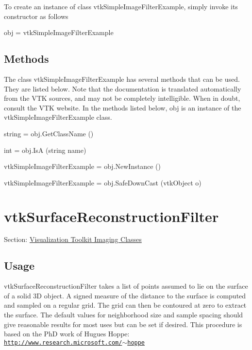 To create an instance of class vtk\-Simple\-Image\-Filter\-Example, simply invoke its constructor as follows \begin{DoxyVerb}  obj = vtkSimpleImageFilterExample
\end{DoxyVerb}
 \hypertarget{vtkwidgets_vtkxyplotwidget_Methods}{}\subsection{Methods}\label{vtkwidgets_vtkxyplotwidget_Methods}
The class vtk\-Simple\-Image\-Filter\-Example has several methods that can be used. They are listed below. Note that the documentation is translated automatically from the V\-T\-K sources, and may not be completely intelligible. When in doubt, consult the V\-T\-K website. In the methods listed below, {\ttfamily obj} is an instance of the vtk\-Simple\-Image\-Filter\-Example class. 
\begin{DoxyItemize}
\item {\ttfamily string = obj.\-Get\-Class\-Name ()}  
\item {\ttfamily int = obj.\-Is\-A (string name)}  
\item {\ttfamily vtk\-Simple\-Image\-Filter\-Example = obj.\-New\-Instance ()}  
\item {\ttfamily vtk\-Simple\-Image\-Filter\-Example = obj.\-Safe\-Down\-Cast (vtk\-Object o)}  
\end{DoxyItemize}\hypertarget{vtkimaging_vtksurfacereconstructionfilter}{}\section{vtk\-Surface\-Reconstruction\-Filter}\label{vtkimaging_vtksurfacereconstructionfilter}
Section\-: \hyperlink{sec_vtkimaging}{Visualization Toolkit Imaging Classes} \hypertarget{vtkwidgets_vtkxyplotwidget_Usage}{}\subsection{Usage}\label{vtkwidgets_vtkxyplotwidget_Usage}
vtk\-Surface\-Reconstruction\-Filter takes a list of points assumed to lie on the surface of a solid 3\-D object. A signed measure of the distance to the surface is computed and sampled on a regular grid. The grid can then be contoured at zero to extract the surface. The default values for neighborhood size and sample spacing should give reasonable results for most uses but can be set if desired. This procedure is based on the Ph\-D work of Hugues Hoppe\-: \href{http://www.research.microsoft.com/~hoppe}{\tt http\-://www.\-research.\-microsoft.\-com/$\sim$hoppe}

